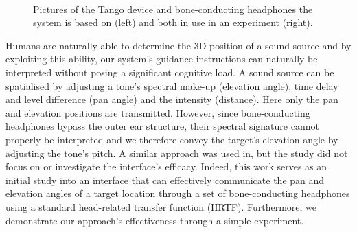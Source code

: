 \documentclass{llncs}
\begin{document}
\begin{figure}[t]
  \centering
~
  \caption{Pictures of the Tango device and bone-conducting headphones the system is based on (left) and both in use in an experiment (right).}
\end{figure}

Humans are naturally able to determine the 3D position of a sound source and by exploiting this ability, our system's guidance instructions can naturally be interpreted without posing a significant cognitive load.
A sound source can be spatialised by adjusting a tone's spectral make-up (elevation angle), time delay and level difference (pan angle) and the intensity (distance).
Here only the pan and elevation positions are transmitted.
However, since bone-conducting headphones bypass the outer ear structure, their spectral signature cannot properly be interpreted and we therefore convey the target's elevation angle by adjusting the tone's pitch.
A similar approach was used in\cite{durette2008visuo}, but the study did not focus on or investigate the interface's efficacy.
Indeed, this work serves as an initial study into an interface that can effectively communicate the pan and elevation angles of a target location through a set of bone-conducting headphones using a standard head-related transfer function (HRTF).
Furthermore, we demonstrate our approach's effectiveness through a simple experiment.
\end{document}
